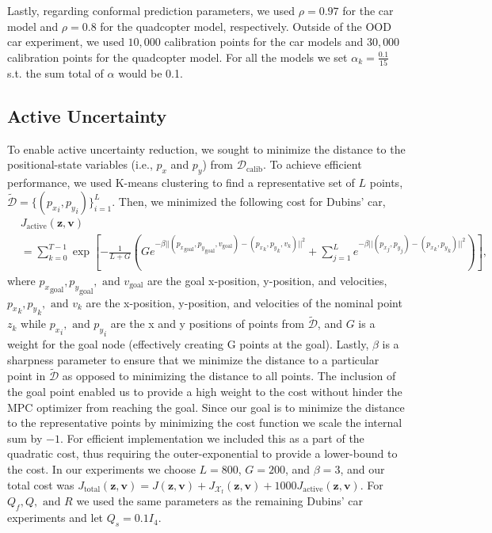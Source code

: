 \documentclass{l4dc2026}
\newcommand{\calib}{\mathcal{D}_{\mathrm{calib}}}
\newcommand{\Z}{\mathbf{z}}
\newcommand{\V}{\mathbf{v}}
\begin{document}
Lastly, regarding conformal prediction parameters, we used $\rho = 0.97$ for the car model and $\rho = 0.8$ for the quadcopter model, respectively. Outside of the OOD car experiment, we used $10,000$ calibration points for the car models and $30,000$ calibration points for the quadcopter model. For all the models we set $\alpha_k = \frac{0.1}{15}$ s.t. the sum total of $\alpha$ would be 0.1.

\subsection{Active Uncertainty}\label{app:uncert_reduc} To enable active uncertainty reduction, we sought to minimize the distance to the positional-state variables (i.e., $p_x$ and $p_y$) from $\calib$. To achieve efficient performance, we used K-means clustering \cite{hastie2009elements} to find a representative set of $L$ points, $\tilde{\mathcal{D}} = \{({p_x}_i, {p_y}_i)\}_{i=1}^{L}$. Then, we minimized the following cost for Dubins' car,
\begin{align}
    &J_\text{active}(\Z,\V)\nonumber\\
    &=\sum_{k=0}^{T-1} \exp\left[-\frac{1}{L + G}\left(Ge^{-\beta||({p_x}_\text{goal}, {p_y}_\text{goal}, v_\text{goal}) - ({p_x}_k, {p_y}_k, v_k)||^2} + \sum_{j=1}^{L}e^{-\beta||({p_x}_j, {p_y}_j) - ({p_x}_k, {p_y}_k)||^2}\right)\right], \label{eq:active_cost}
\end{align}
where ${p_x}_\text{goal}, {p_y}_\text{goal},\text{ and } v_\text{goal}$ are the goal x-position, y-position, and velocities, ${p_x}_k, {p_y}_k, \text{ and }v_k$ are the x-position, y-position, and velocities of the nominal point $z_k$ while ${p_x}_i, \text{ and }{p_y}_i$ are the x and y positions of points from $\tilde{\mathcal{D}}$, and $G$ is a weight for the goal node (effectively creating G points at the goal). Lastly, $\beta$ is a sharpness parameter to ensure that we minimize the distance to a particular point in $\tilde{\mathcal D}$ as opposed to minimizing the distance to all points. The inclusion of the goal point enabled us to provide a high weight to the cost without hinder the MPC optimizer from reaching the goal. Since our goal is to minimize the distance to the representative points by minimizing the cost function we scale the internal sum by $-1$. For efficient implementation we included this as a part of the quadratic cost, thus requiring the outer-exponential to provide a lower-bound to the cost. In our experiments we choose $L=800$, $G=200$, and $\beta = 3$, and our total cost was $J_\text{total}(\Z,\V) = J(\Z,\V) + J_{\mathcal{X}_\textrm{f}}(\Z,\V) + 1000J_\text{active}(\Z,\V)$. For $Q_f, Q, \text{ and } R$ we used the same parameters as the remaining Dubins' car experiments and let $Q_s = 0.1I_4$. 
\end{document}
